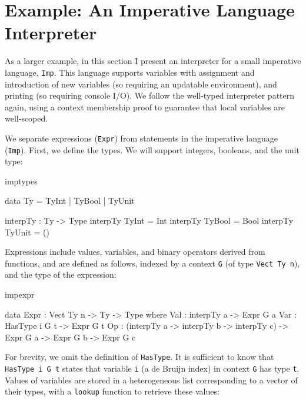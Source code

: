\section{Example: An Imperative Language Interpreter}

\newcommand{\Imp}{\texttt{Imp}}

\label{sect:impint}

As a larger example, in this section I present an interpreter for 
a small imperative language, \Imp{}. This language supports variables
with assignment and introduction of new
variables (so requiring an updatable environment), 
and printing (so requiring console I/O).
We follow the well-typed interpreter pattern again, using a context membership
proof to guarantee that local variables are well-scoped. 

We separate expressions (\texttt{Expr}) from statements in the imperative
language (\texttt{Imp}). First, we define the types. We will support integers,
booleans, and the unit type:

\begin{SaveVerbatim}{imptypes}

data Ty = TyInt | TyBool | TyUnit 

interpTy : Ty -> Type
interpTy TyInt  = Int
interpTy TyBool = Bool
interpTy TyUnit = ()

\end{SaveVerbatim}

\noindent
Expressions include values, variables, and binary operators derived from 
\Idris{} functions, and are defined as follows, indexed by a context
\texttt{G} (of type \texttt{Vect Ty n}),
and the type of the expression:

\begin{SaveVerbatim}{impexpr}

data Expr : Vect Ty n -> Ty -> Type where
     Val : interpTy a -> Expr G a
     Var : HasType i G t -> Expr G t
     Op  : (interpTy a -> interpTy b -> interpTy c) ->
            Expr G a -> Expr G b -> Expr G c

\end{SaveVerbatim}

\noindent
For brevity, we omit the definition of \texttt{HasType}. It is sufficient to
know that \texttt{HasType i G t} states that variable \texttt{i} (a de Bruijn
index) in context \texttt{G} has type \texttt{t}.
Values of variables are stored in a heterogeneous list
corresponding to a vector of their types, with a \texttt{lookup} function
to retrieve these values:

